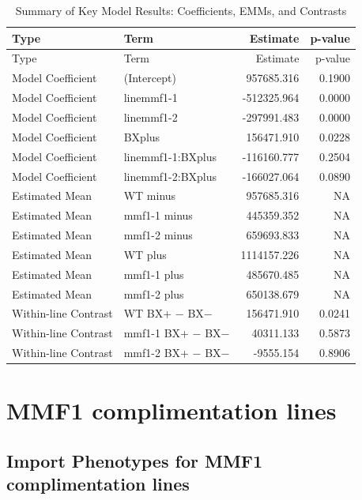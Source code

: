 \documentclass[
  10pt,
]{article}
\begin{document}
\begin{longtable}[]{@{}llrr@{}}
\caption{Summary of Key Model Results: Coefficients, EMMs, and
Contrasts}\tabularnewline
\toprule\noalign{}
Type & Term & Estimate & p-value \\
\midrule\noalign{}
\endfirsthead
\toprule\noalign{}
Type & Term & Estimate & p-value \\
\midrule\noalign{}
\endhead
\bottomrule\noalign{}
\endlastfoot
Model Coefficient & (Intercept) & 957685.316 & 0.1900 \\
Model Coefficient & linemmf1-1 & -512325.964 & 0.0000 \\
Model Coefficient & linemmf1-2 & -297991.483 & 0.0000 \\
Model Coefficient & BXplus & 156471.910 & 0.0228 \\
Model Coefficient & linemmf1-1:BXplus & -116160.777 & 0.2504 \\
Model Coefficient & linemmf1-2:BXplus & -166027.064 & 0.0890 \\
Estimated Mean & WT minus & 957685.316 & NA \\
Estimated Mean & mmf1-1 minus & 445359.352 & NA \\
Estimated Mean & mmf1-2 minus & 659693.833 & NA \\
Estimated Mean & WT plus & 1114157.226 & NA \\
Estimated Mean & mmf1-1 plus & 485670.485 & NA \\
Estimated Mean & mmf1-2 plus & 650138.679 & NA \\
Within-line Contrast & WT BX+ − BX− & 156471.910 & 0.0241 \\
Within-line Contrast & mmf1-1 BX+ − BX− & 40311.133 & 0.5873 \\
Within-line Contrast & mmf1-2 BX+ − BX− & -9555.154 & 0.8906 \\
\end{longtable}

\newpage

\newpage

\section{MMF1 complimentation lines}\label{mmf1-complimentation-lines}

\subsection{Import Phenotypes for MMF1 complimentation
lines}\label{import-phenotypes-for-mmf1-complimentation-lines}
\end{document}
